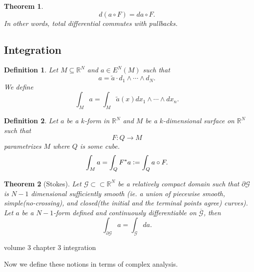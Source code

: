 \documentclass{article}
\newtheorem{theorem}{Theorem} [section]
\newtheorem{definition}{Definition}[section]
\newcommand{\defeq}{\vcentcolon=}
\newcommand{\R}[0]{\mathbb{R}}
\begin{document}
\begin{theorem}
  \begin{equation*}
    d(a\circ F) = da\circ F.
  \end{equation*}
  In other words, total differential commutes with pullbacks.
\end{theorem}

\subsection{Integration}

\begin{definition}
  Let $M\subseteq\R^N$ and $a\in E^N(M)$ such that 
  \begin{equation*}
    a = \tilde{a}\cdot d_1\wedge\cdots \wedge d_N.
  \end{equation*}
  We define 
  \begin{equation*}
    \int_M a = \int_M \tilde{a}(x) dx_1\wedge\cdots\wedge dx_n. 
  \end{equation*}
\end{definition}

\begin{definition}
  Let $a$ be a $k$-form in $\R^N$ and $M$ be a $k$-dimensional surface on $\R^N$ such that 
  \begin{equation*}
    F:Q\to M
  \end{equation*}
  parametrizes $M$ where $Q$ is some cube.
  \begin{equation*}
    \int_M a = \int_QF^*a\defeq \int_Q a\circ F.
  \end{equation*}
\end{definition}
\begin{theorem}[Stokes]
  Let $\mathcal{G}\subset\subset\R^N$ be a relatively compact domain such that $\partial \mathcal{G}$ is $N-1$ dimensional sufficiently smooth (ie. a union of piecewise smooth, simple(no-crossing), and closed(the initial and the terminal points agree) curves). 
  Let $a$ be a $N-1$-form defined and continuously differentiable on $\overline{\mathcal{G}}$, then 
  \begin{equation*}
    \int_{\partial \mathcal{G}}a = \int_{\mathcal{G}}da.
  \end{equation*}
\end{theorem}

\cite{Lieb} volume 3 chapter 3 integration \\
\par Now we define these notions in terms of complex analysis.
\end{document}
